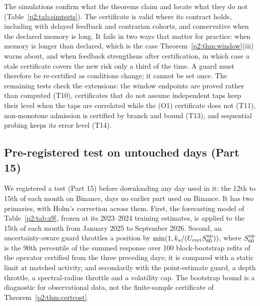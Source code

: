 The simulations confirm what the theorems claim and locate what they do not (Table~\ref{p2:tab:simtests}). The certificate is valid where its contract holds, including with delayed feedback and contrarian cohorts, and conservative when the declared memory is long. It fails in two ways that matter for practice: when memory is longer than declared, which is the case Theorem~\ref{p2:thm:window}(iii) warns about, and when feedback strengthens after certification, in which case a stale certificate covers the new risk only a third of the time. A guard must therefore be re-certified as conditions change; it cannot be set once. The remaining tests check the extensions: the window endpoints are proved rather than computed (T10), certificates that do not assume independent taps keep their level when the taps are correlated while the (O1) certificate does not (T11), non-monotone admission is certified by branch and bound (T13), and sequential probing keeps its error level (T14).

\subsection{Pre-registered test on untouched days (Part 15)}\label{p2:sec:p15}
We registered a test (Part 15) before downloading any day used in it: the 12th to 15th of each month on Binance, days no earlier part used on Binance. It has two primaries, with Holm's correction across them. First, the forecasting model of Table~\ref{p2:tab:z9}, frozen at its 2023--2024 training estimates, is applied to the 15th of each month from January 2025 to September 2026. Second, an uncertainty-aware guard throttles a position by $\min(1,k_s/(U_{\rm cert}S^{\rm up}_{60}))$, where $S^{\rm up}_{60}$ is the 90th percentile of the summed response over 100 block-bootstrap refits of the operator certified from the three preceding days; it is compared with a static limit at matched activity, and secondarily with the point-estimate guard, a depth throttle, a spectral-radius throttle and a volatility cap. The bootstrap bound is a diagnostic for observational data, not the finite-sample certificate of Theorem~\ref{p2:thm:certcost}.

